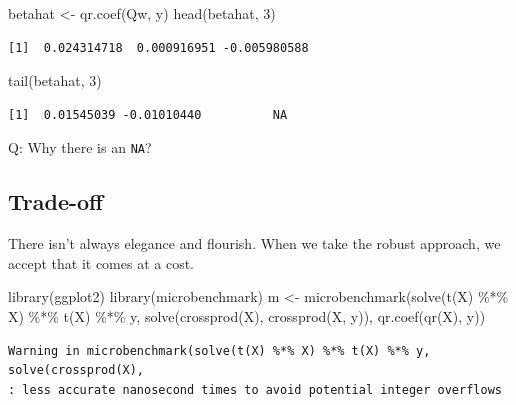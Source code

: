 \documentclass[
  letterpaper,
  DIV=11,
  numbers=noendperiod]{scrreprt}
\newenvironment{Shaded}{\begin{snugshade}}{\end{snugshade}}
\newcommand{\DecValTok}[1]{\textcolor[rgb]{0.68,0.00,0.00}{#1}}
\newcommand{\FunctionTok}[1]{\textcolor[rgb]{0.28,0.35,0.67}{#1}}
\newcommand{\NormalTok}[1]{\textcolor[rgb]{0.00,0.23,0.31}{#1}}
\newcommand{\OtherTok}[1]{\textcolor[rgb]{0.00,0.23,0.31}{#1}}
\newcommand{\SpecialCharTok}[1]{\textcolor[rgb]{0.37,0.37,0.37}{#1}}
\begin{document}
\begin{Shaded}
\begin{Highlighting}[]
\NormalTok{betahat }\OtherTok{\textless{}{-}} \FunctionTok{qr.coef}\NormalTok{(Qw, y)}
\FunctionTok{head}\NormalTok{(betahat, }\DecValTok{3}\NormalTok{)}
\end{Highlighting}
\end{Shaded}

\begin{verbatim}
[1]  0.024314718  0.000916951 -0.005980588
\end{verbatim}

\begin{Shaded}
\begin{Highlighting}[]
\FunctionTok{tail}\NormalTok{(betahat, }\DecValTok{3}\NormalTok{)}
\end{Highlighting}
\end{Shaded}

\begin{verbatim}
[1]  0.01545039 -0.01010440          NA
\end{verbatim}

Q: Why there is an \texttt{NA}?

\subsection{Trade-off}\label{trade-off}

There isn't always elegance and flourish. When we take the robust
approach, we accept that it comes at a cost.

\begin{Shaded}
\begin{Highlighting}[]
\FunctionTok{library}\NormalTok{(ggplot2)}
\FunctionTok{library}\NormalTok{(microbenchmark)}
\NormalTok{m }\OtherTok{\textless{}{-}} \FunctionTok{microbenchmark}\NormalTok{(}\FunctionTok{solve}\NormalTok{(}\FunctionTok{t}\NormalTok{(X) }\SpecialCharTok{\%*\%}\NormalTok{ X) }\SpecialCharTok{\%*\%} \FunctionTok{t}\NormalTok{(X) }\SpecialCharTok{\%*\%}\NormalTok{ y,}
                    \FunctionTok{solve}\NormalTok{(}\FunctionTok{crossprod}\NormalTok{(X), }\FunctionTok{crossprod}\NormalTok{(X, y)),}
                    \FunctionTok{qr.coef}\NormalTok{(}\FunctionTok{qr}\NormalTok{(X), y))}
\end{Highlighting}
\end{Shaded}

\begin{verbatim}
Warning in microbenchmark(solve(t(X) %*% X) %*% t(X) %*% y, solve(crossprod(X),
: less accurate nanosecond times to avoid potential integer overflows
\end{verbatim}
\end{document}
